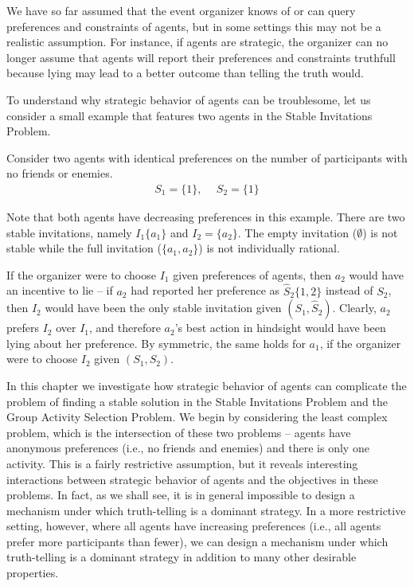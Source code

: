 \label{GT:chapter}


We have so far assumed that the event organizer knows of or can query preferences and constraints of agents, but in some settings this may not be a realistic assumption. For instance, if agents are strategic, the organizer can no longer assume that agents will report their preferences and constraints truthfull because lying may lead to a better outcome than telling the truth would.

To understand why strategic behavior of agents can be troublesome, let us consider a small example that features two agents in the Stable Invitations Problem.

\begin{example} \label{GT:eg:strategicAgents}
		Consider two agents with identical preferences on the number of participants with no friends or enemies. 
	\begin{equation*}
		\begin{aligned}
				S_1 = \{1\}, ~~& S_2 = \{1\}
		\end{aligned}
	\end{equation*}

Note that both agents have decreasing preferences in this example. 
There are two stable invitations, namely $I_1 \{a_1\}$ and $I_2 = \{a_2\}$. 
The empty invitation ($\emptyset$) is not stable while the full invitation ($\{a_1,a_2\}$) is not individually rational. 

If the organizer were to choose $I_1$ given preferences of agents, then $a_2$ would have an incentive to lie -- if $a_2$ had reported her preference as $\hat{S}_2 \{1, 2\}$ instead of $S_2$, then $I_2$ would have been the only stable invitation given $(S_1, \hat{S}_2)$. Clearly, $a_2$ prefers $I_2$ over $I_1$, and therefore $a_2$'s best action in hindsight would have been lying about her preference. By symmetric, the same holds for $a_1$, if the organizer were to choose $I_2$ given $(S_1, S_2)$.
\end{example}

In this chapter we investigate how strategic behavior of agents can complicate the problem of finding a stable solution in the Stable Invitations Problem and the Group Activity Selection Problem. We begin by considering the least complex problem, which is the intersection of these two problems -- agents have anonymous preferences (i.e., no friends and enemies) and there is only one activity. This is a fairly restrictive assumption, but it reveals interesting interactions between strategic behavior of agents and the objectives in these problems. In fact, as we shall see, it is in general impossible to design a mechanism under which truth-telling is a dominant strategy. In a more restrictive setting, however, where all agents have increasing preferences (i.e., all agents prefer more participants than fewer), we can design a mechanism under which truth-telling is a dominant strategy in addition to many other desirable properties. 



